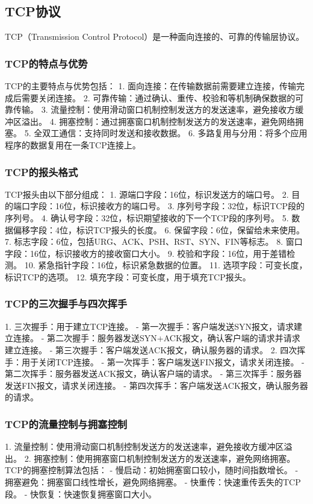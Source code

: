 \documentclass{book}
\begin{document}
\subsection{TCP协议}
TCP（Transmission Control Protocol）是一种面向连接的、可靠的传输层协议。
\subsubsection{TCP的特点与优势}
TCP的主要特点与优势包括：
1. 面向连接：在传输数据前需要建立连接，传输完成后需要关闭连接。
2. 可靠传输：通过确认、重传、校验和等机制确保数据的可靠传输。
3. 流量控制：使用滑动窗口机制控制发送方的发送速率，避免接收方缓冲区溢出。
4. 拥塞控制：通过拥塞窗口机制控制发送方的发送速率，避免网络拥塞。
5. 全双工通信：支持同时发送和接收数据。
6. 多路复用与分用：将多个应用程序的数据复用在一条TCP连接上。
\subsubsection{TCP的报头格式}
TCP报头由以下部分组成：
1. 源端口字段：16位，标识发送方的端口号。
2. 目的端口字段：16位，标识接收方的端口号。
3. 序列号字段：32位，标识TCP段的序列号。
4. 确认号字段：32位，标识期望接收的下一个TCP段的序列号。
5. 数据偏移字段：4位，标识TCP报头的长度。
6. 保留字段：6位，保留给未来使用。
7. 标志字段：6位，包括URG、ACK、PSH、RST、SYN、FIN等标志。
8. 窗口字段：16位，标识接收方的接收窗口大小。
9. 校验和字段：16位，用于差错检测。
10. 紧急指针字段：16位，标识紧急数据的位置。
11. 选项字段：可变长度，标识TCP的选项。
12. 填充字段：可变长度，用于填充TCP报头。
\subsubsection{TCP的三次握手与四次挥手}
1. 三次握手：用于建立TCP连接。
   - 第一次握手：客户端发送SYN报文，请求建立连接。
   - 第二次握手：服务器发送SYN+ACK报文，确认客户端的请求并请求建立连接。
   - 第三次握手：客户端发送ACK报文，确认服务器的请求。
2. 四次挥手：用于关闭TCP连接。
   - 第一次挥手：客户端发送FIN报文，请求关闭连接。
   - 第二次挥手：服务器发送ACK报文，确认客户端的请求。
   - 第三次挥手：服务器发送FIN报文，请求关闭连接。
   - 第四次挥手：客户端发送ACK报文，确认服务器的请求。
\subsubsection{TCP的流量控制与拥塞控制}
1. 流量控制：使用滑动窗口机制控制发送方的发送速率，避免接收方缓冲区溢出。
2. 拥塞控制：使用拥塞窗口机制控制发送方的发送速率，避免网络拥塞。TCP的拥塞控制算法包括：
   - 慢启动：初始拥塞窗口较小，随时间指数增长。
   - 拥塞避免：拥塞窗口线性增长，避免网络拥塞。
   - 快重传：快速重传丢失的TCP段。
   - 快恢复：快速恢复拥塞窗口大小。
\end{document}
